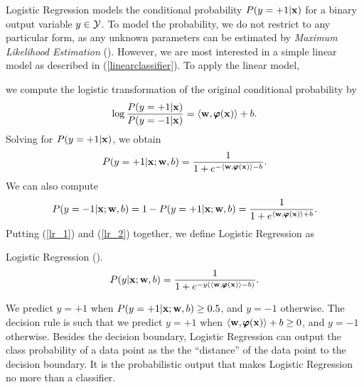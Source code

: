 {Logistic Regression models the conditional probability $P(y=+1|\mathbf {x})$ for a binary output variable $y\in\mathcal{Y}$.
To model the probability, we do not restrict to any particular form, as any unknown parameters can be estimated by \textit{Maximum Likelihood Estimation} (\mle).
However, we are most interested in a simple linear model as described in (\ref{linearclassifier}).
To apply the linear model,

we compute the logistic transformation of the original conditional probability by
\begin{align*}
	\log\frac{P(y=+1|\mathbf {x})}{P(y=-1|\mathbf {x})} = \langle \mathbf {w}, \pmb \varphi(\mathbf {x}) \rangle + b.
\end{align*}
Solving for $P(y=+1|\mathbf {x})$, we obtain
\begin{align}
	P(y=+1|\mathbf {x};\mathbf {w},b) = \frac{1}{1+e^{ -\langle \mathbf {w}, \pmb \varphi(\mathbf {x}) \rangle-b }}. \label{lr_1}
\end{align}
We can also compute
\begin{align}
	P(y=-1|\mathbf {x};\mathbf {w},b)=1-P(y=+1|\mathbf {x};\mathbf {w},b)=\frac{1}{1+e^{ \langle \mathbf {w}, \pmb \varphi(\mathbf {x}) \rangle+b }}. \label{lr_2}
\end{align}
Putting (\ref{lr_1}) and (\ref{lr_2}) together, we define Logistic Regression as
\begin{definition}{Logistic Regression (\lr).} \label{logistic_regression}
	\begin{align*}
		P(y|\mathbf {x};\mathbf {w},b) = \frac{1}{1+e^{ -y(\langle \mathbf {w}, \pmb \varphi(\mathbf {x}) \rangle-b) }}.
	\end{align*}
\end{definition}
\noindent
We predict $y=+1$ when $P(y=+1|\mathbf {x};\mathbf {w},b)\ge0.5$, and $y=-1$ otherwise.
The decision rule is such that we predict $y=+1$ when $\langle \mathbf {w}, \pmb \varphi(\mathbf {x}) \rangle+b\ge0$, and $y=-1$ otherwise.
Besides the decision boundary, Logistic Regression can output the class probability of a data point as the the ``distance'' of the data point to the decision boundary.
It is the probabilistic output that makes Logistic Regression no more than a classifier.

}
